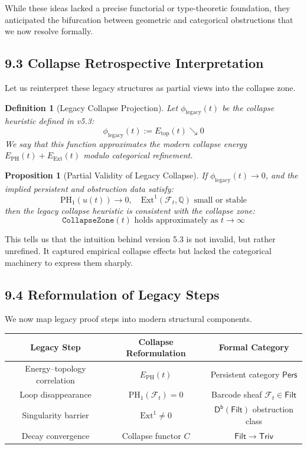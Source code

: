 \documentclass[11pt]{article}
\newtheorem{definition}[theorem]{Definition}
\newtheorem{proposition}[theorem]{Proposition}
\begin{document}
While these ideas lacked a precise functorial or type-theoretic foundation,  
they anticipated the bifurcation between geometric and categorical obstructions that we now resolve formally.

\subsection{9.3 Collapse Retrospective Interpretation}

Let us reinterpret these legacy structures as partial views into the collapse zone.

\begin{definition}[Legacy Collapse Projection]
Let \( \phi_{\mathrm{legacy}}(t) \) be the collapse heuristic defined in v5.3:
\[
\phi_{\mathrm{legacy}}(t) := E_{\mathrm{top}}(t) \searrow 0
\]
We say that this function approximates the modern collapse energy \( E_{\mathrm{PH}}(t) + E_{\mathrm{Ext}}(t) \) modulo categorical refinement.
\end{definition}

\begin{proposition}[Partial Validity of Legacy Collapse]
If \( \phi_{\mathrm{legacy}}(t) \to 0 \), and the implied persistent and obstruction data satisfy:
\[
\mathrm{PH}_1(u(t)) \to 0, \quad \mathrm{Ext}^1(\mathcal{F}_t, \mathbb{Q}) \text{ small or stable}
\]
then the legacy collapse heuristic is consistent with the collapse zone:
\[
\texttt{CollapseZone}(t) \text{ holds approximately as } t \to \infty
\]
\end{proposition}

This tells us that the intuition behind version 5.3 is not invalid, but rather unrefined.  
It captured empirical collapse effects but lacked the categorical machinery to express them sharply.

\subsection{9.4 Reformulation of Legacy Steps}

We now map legacy proof steps into modern structural components.

\begin{center}
\begin{tabular}{|c|c|c|}
\hline
\textbf{Legacy Step} & \textbf{Collapse Reformulation} & \textbf{Formal Category} \\
\hline
Energy–topology correlation & \( E_{\mathrm{PH}}(t) \) & Persistent category \( \mathsf{Pers} \) \\
Loop disappearance & \( \mathrm{PH}_1(\mathcal{F}_t) = 0 \) & Barcode sheaf \( \mathcal{F}_t \in \mathsf{Filt} \) \\
Singularity barrier & \( \mathrm{Ext}^1 \neq 0 \) & \( \mathsf{D^b(Filt)} \) obstruction class \\
Decay convergence & Collapse functor \( C \) & \( \mathsf{Filt} \to \mathsf{Triv} \) \\
\hline
\end{tabular}
\end{center}
\end{document}
